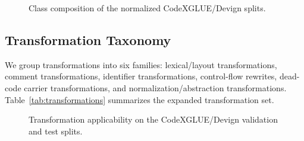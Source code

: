 \documentclass[a4paper,fleqn]{cas-dc}
\begin{document}
\begin{figure}[t]
  \centering
  \resizebox{\columnwidth}{!}{}
  \caption{Class composition of the normalized CodeXGLUE/Devign splits.}
  \label{fig:dataset-composition}
\end{figure}

\subsection{Transformation Taxonomy}

We group transformations into six families: lexical/layout transformations,
comment transformations, identifier transformations, control-flow rewrites,
dead-code carrier transformations, and normalization/abstraction
transformations. Table~\ref{tab:transformations} summarizes the expanded
transformation set.

\begin{table}[t]
  \centering
  \caption{Transformation taxonomy and observed applicability on the CodeXGLUE/Devign test split.}
  \label{tab:transformations}
\end{table}

\begin{figure}[t]
  \centering
  \resizebox{\columnwidth}{!}{}
  \caption{Transformation applicability on the CodeXGLUE/Devign validation and test splits.}
  \label{fig:transformation-applicability}
\end{figure}
\end{document}
